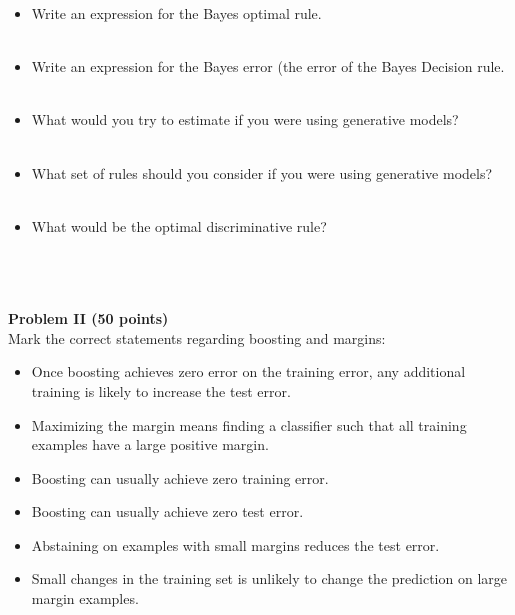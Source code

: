 \documentclass[10pt]{article}
\begin{document}
   \begin{itemize}
   \item Write an expression for the Bayes optimal rule.
     \\~\\
     \underline{\hspace{6in}}
   \item Write an expression for the Bayes error (the error of the
     Bayes Decision rule.
     \\~\\
     \underline{\hspace{6in}}
   \item What would you try to estimate if you were using 
     generative models?
     \\~\\
     \underline{\hspace{6in}}
   \item What set of rules should you consider if you were using
     generative models?
     \\~\\
     \underline{\hspace{6in}}
   \item What would be the optimal discriminative rule?
     \\~\\
     \underline{\hspace{6in}}
   \end{itemize}

    ~\\
    ~\\

\noindent
    {\bf Problem II (50 points)}\\
    Mark the correct statements regarding boosting and margins:
    \begin{itemize}
      \item Once boosting achieves zero error on the training
        error, any additional training is likely to increase the test
        error.
        \item Maximizing the margin means finding a classifier such
          that all training examples have a large positive margin.
        \item Boosting can usually achieve zero training error.
        \item Boosting can usually achieve zero test error.
        \item Abstaining on examples with small margins reduces the
          test error.
          \item Small changes in the training set is unlikely to
            change the prediction on large margin examples.
      \end{itemize}
\end{document}
